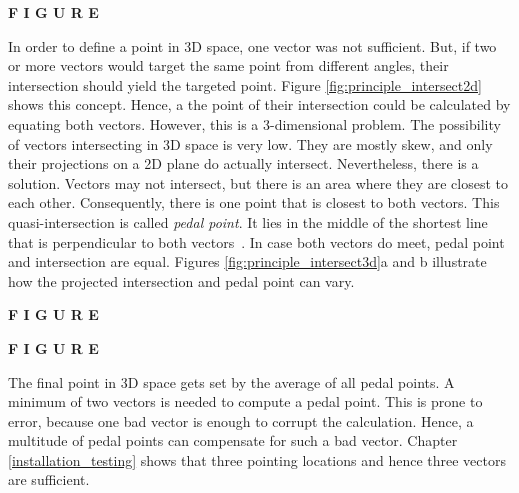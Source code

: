 \textbf{F I G U R E}

In order to define a point in \ac{3D} space, one vector was not sufficient. But, if two or more vectors would target the same point from different angles, their intersection should yield the targeted point. Figure \ref{fig:principle_intersect2d} shows this concept. Hence, a the point of their intersection could be calculated by equating both vectors. However, this is a 3-dimensional problem. The possibility of vectors intersecting in \ac{3D} space is very low. They are mostly skew, and only their projections on a \ac{2D} plane do actually intersect. Nevertheless, there is a solution. Vectors may not intersect, but there is an area where they are closest to each other. Consequently, there is one point that is closest to both vectors. This quasi-intersection is called \textit{pedal point}. It lies in the middle of the shortest line that is perpendicular to both vectors~\cite{PedalPoint}. In case both vectors do meet, pedal point and intersection are equal. Figures \ref{fig:principle_intersect3d}a and b illustrate how the projected intersection and pedal point can vary.

\textbf{F I G U R E}

\textbf{F I G U R E}

The final point in \ac{3D} space gets set by the average of all pedal points. A minimum of two vectors is needed to compute a pedal point. This is prone to error, because one bad vector is enough to corrupt the calculation. Hence, a multitude of pedal points can compensate for such a bad vector. Chapter \ref{installation_testing} shows that three pointing locations and hence three vectors are sufficient.

